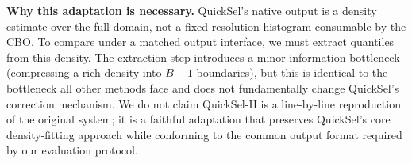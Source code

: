 \noindent\textbf{Why this adaptation is necessary.}
QuickSel's native output is a density estimate over the full domain, not a
fixed-resolution histogram consumable by the CBO. To compare under a matched
output interface, we must extract quantiles from this density. The extraction
step introduces a minor information bottleneck (compressing a rich density into
$B{-}1$ boundaries), but this is identical to the bottleneck all other methods
face and does not fundamentally change QuickSel's correction mechanism. We do
not claim QuickSel-H is a line-by-line reproduction of the original system; it
is a faithful adaptation that preserves QuickSel's core density-fitting approach
while conforming to the common output format required by our evaluation protocol.
